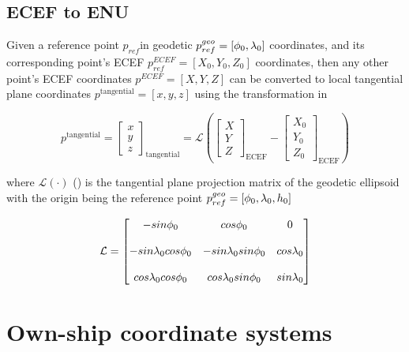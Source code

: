 \subsection{ECEF to ENU}\label{ssec:ecef-to-enu}



Given a reference point $p_{ref}$in geodetic $p_{ref}^{geo}=[{\phi}_0,{\lambda}_0]$ coordinates, and its corresponding point's ECEF $p_{ref}^{ECEF}=[X_0,Y_0,Z_0]$ coordinates, then any other point's ECEF coordinates $p^{ECEF}=[X,Y,Z]$ can be converted to local tangential plane coordinates $p^{\text{tangential}}=[x,y,z]$ using the transformation in 



\begin{equation} \label{eq:transformation_ECEF2ENU}
p^{\text{tangential}}=
	\begin{bmatrix}
		x\\
		y\\
		z
	\end{bmatrix}_{\text{tangential}}= \mathcal{L}\left(\begin{bmatrix}
		X\\
		Y\\
		Z
	\end{bmatrix}_{\text{ECEF}} - \begin{bmatrix}
		X_0\\
		Y_0\\
		Z_0
	\end{bmatrix}_{\text{ECEF}}\right)
\end{equation}


where $\mathcal{L}(\cdot)$ () is the tangential plane projection matrix of the geodetic ellipsoid with the origin being the reference point $p_{ref}^{geo} = [{\phi}_0,{\lambda}_0,h_0]$ 




\begin{equation} \label{eq:Lambda}
\mathcal{L} = \begin{bmatrix}
-sin{\phi}_0  & cos{\phi}_0 & 0 \\\\
-sin{\lambda}_0cos{\phi}_0 & -sin{\lambda}_0sin{\phi}_0 & cos{\lambda}_0\\\\
cos{\lambda}_0 cos{\phi}_0 & cos{\lambda}_0 sin{\phi}_0 & sin{\lambda}_0
\end{bmatrix}
\end{equation}

\section{Own-ship coordinate systems}



